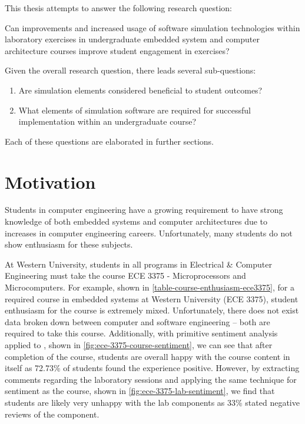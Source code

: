 This thesis attempts to answer the following research question:

\begin{displayquote}
Can improvements and increased usage of software simulation technologies within laboratory exercises in undergraduate embedded system and computer architecture courses improve student engagement in exercises?
\end{displayquote}

Given the overall research question, there leads several sub-questions: 

\begin{enumerate}
	\item Are simulation elements considered beneficial to student outcomes?
	\item What elements of simulation software are required for successful implementation within an undergraduate course?
\end{enumerate}

Each of these questions are elaborated in further sections. 

\section{Motivation}

Students in computer engineering have a growing requirement to have strong knowledge of both embedded systems and computer architectures due to increases in computer engineering careers\cite[p.~30]{cec2016}\cite{bls2014}. Unfortunately, many students do not show enthusiasm for these subjects. 

At Western University, students in all programs in Electrical \& Computer Engineering must take the course ECE 3375 - Microprocessors and Microcomputers\cite{uwo-we-programprogression, eceoutline-ece3375}. For example, shown in \cref{table-course-enthusiasm-ece3375}, for a required course in embedded systems at Western University (ECE 3375)\cite{eceOutlines}, student enthusiasm for the course is extremely mixed. Unfortunately, there does not exist data broken down between computer and software engineering -- both are required to take this course. Additionally, with primitive sentiment analysis applied to \cite{evals:ece3375-2013, evals:ece3375-2014}, shown in \cref{fig:ece-3375-course-sentiment}, we can see that after completion of the course, students are overall happy with the course content in itself as 72.73\% of students found the experience positive. However, by extracting comments regarding the laboratory sessions and applying the same technique for sentiment as the course, shown in \cref{fig:ece-3375-lab-sentiment}, we find that students are likely very unhappy with the lab components as 33\% stated negative reviews of the component. 

